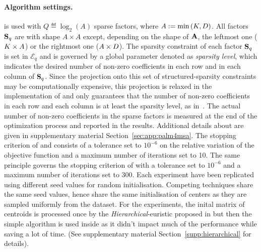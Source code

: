 \paragraph{Algorithm settings.} 
\qkmeans is used with $Q\eqdef\log_2\left (A\right )$ sparse factors, where  $A:=\min\left (K, D\right )$. 
All factors ${\mathbf{S}}_q$ are with shape $A \times A$ except, depending on the shape of ${\mathbf{A}}$, the leftmost one ($K\times A$) or the rightmost one ($A\times D$). 
The sparsity constraint of each factor ${\mathbf{S}}_q$ is set in $\mathcal{E}_q$ and is governed by a global parameter denoted as \textit{sparsity level}, which indicates the desired number of non-zero coefficients in each row and in each column of ${\mathbf{S}}_q$. 
Since the projection onto this set of structured-sparsity constraints may be computationally expensive, this projection is relaxed in the implementation of \palm and only guarantees that the number of non-zero coefficients in each row and each column is at least the sparsity level, as in~\cite{LeMagoarou2016Flexible}.
The actual number of non-zero coefficients in the sparse factors is measured at the end of the optimization process and reported in the results.
Additional details about \palm are given in supplementary material Section~\ref{sec:app:palm4msa}.
The stopping criterion of \kmeans and \qkmeans consists of a tolerance set to $10^{-6}$ on the relative variation of the objective function and a maximum number of iterations set to 10. 
The same principle governs the stopping criterion of \palm with a tolerance set to $10^{-6}$ and a maximum number of iterations set to 300. Each experiment have been replicated using different seed values for random initialisation. 
Competing techniques share the same seed values, hence share the same initialisation of centers as they are sampled uniformly from the dataset. For the \qkmeans experiments, the inital matrix of centroids is processed once by the \textit{Hierarchical}-\palm euristic proposed in \cite{LeMagoarou2016Flexible} but then the simple \palm algorithm is used inside \qkmeans as it didn't impact much of the performance while saving a lot of time. (See supplementary material Section~\ref{supp:hierarchical} for details).

%

